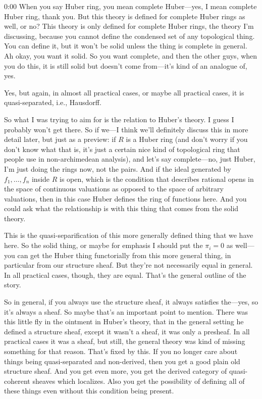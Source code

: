 \begin{unfinished}{0:00}
When you say Huber ring, you mean complete Huber---yes, I mean complete Huber ring, thank you. But this theory is defined for complete Huber rings as well, or no? This theory is only defined for complete Huber rings, the theory I'm discussing, because you cannot define the condensed set of any topological thing. You can define it, but it won't be solid unless the thing is complete in general. Ah okay, you want it solid. So you want complete, and then the other guys, when you do this, it is still solid but doesn't come from---it's kind of an analogue of, yes.

Yes, but again, in almost all practical cases, or maybe all practical cases, it is quasi-separated, i.e., Hausdorff.

So what I was trying to aim for is the relation to Huber's theory. I guess I probably won't get there. So if we---I think we'll definitely discuss this in more detail later, but just as a preview: if $R$ is a Huber ring (and don't worry if you don't know what that is, it's just a certain nice kind of topological ring that people use in non-archimedean analysis), and let's say complete---no, just Huber, I'm just doing the rings now, not the pairs. And if the ideal generated by $f_1, \ldots, f_n$ inside $R$ is open, which is the condition that describes rational opens in the space of continuous valuations as opposed to the space of arbitrary valuations, then in this case Huber defines the ring of functions here. And you could ask what the relationship is with this thing that comes from the solid theory.

This is the quasi-separification of this more generally defined thing that we have here. So the solid thing, or maybe for emphasis I should put the $\pi_i = 0$ as well---you can get the Huber thing functorially from this more general thing, in particular from our structure sheaf. But they're not necessarily equal in general. In all practical cases, though, they are equal. That's the general outline of the story.

So in general, if you always use the structure sheaf, it always satisfies the---yes, so it's always a sheaf. So maybe that's an important point to mention. There was this little fly in the ointment in Huber's theory, that in the general setting he defined a structure sheaf, except it wasn't a sheaf, it was only a presheaf. In all practical cases it was a sheaf, but still, the general theory was kind of missing something for that reason. That's fixed by this. If you no longer care about things being quasi-separated and non-derived, then you get a good plain old structure sheaf. And you get even more, you get the derived category of quasi-coherent sheaves which localizes. Also you get the possibility of defining all of these things even without this condition being present.


\end{unfinished}

